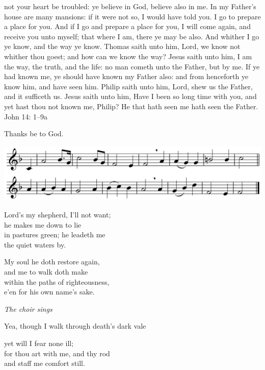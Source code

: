 
 not your heart be troubled: ye believe in God, believe also in me. In my Father’s
house are many mansions: if it were not so, I would have told you. I go to prepare
a place for you. And if I go and prepare a place for you, I will come again, and receive
you unto myself; that where I am, there ye may be also. And whither I go ye know, and
the way ye know. Thomas saith unto him, Lord, we know not whither thou goest; and
how can we know the way? Jesus saith unto him, I am the way, the truth, and the life:
no man cometh unto the Father, but by me. If ye had known me, ye should have known
my Father also: and from henceforth ye know him, and have seen him. Philip saith unto
him, Lord, shew us the Father, and it sufficeth us. Jesus saith unto him, Have I been so
long time with you, and yet hast thou not known me, Philip? He that hath seen me hath
seen the Father.
John 14: 1–9a

Thanks be to God.




\begin{center}
	\includegraphics[width=.8\textwidth]{hymn2.png}

\end{center}

\begin{center}

 Lord’s my shepherd, I’ll not want;\\
he makes me down to lie\\
in pastures green; he leadeth me\\
the quiet waters by.

My soul he doth restore again,\\
and me to walk doth make\\
within the paths of righteousness,\\
e’en for his own name’s sake.
\end{center}


\begin{minipage}[t]{0.3\textwidth}
\begin{flushleft}
\textcolor{qred}{\textit{The choir sings}}
\end{flushleft}
\end{minipage}\begin{minipage}[t]{0.7\textwidth}
\begin{flushleft}
Yea, though I walk through death’s dark vale\end{flushleft}
\end{minipage}\vspace{-.7em}\begin{center}
yet will I fear none ill;\\ for thou art with me, and thy rod\\
and staff me comfort still.\end{center}


